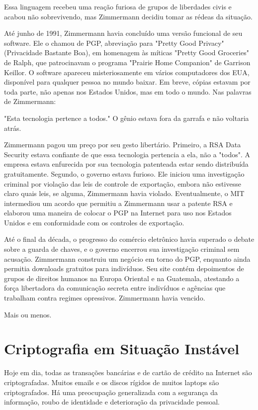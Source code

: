 \documentclass{book}
\begin{document}
Essa linguagem recebeu uma reação furiosa de grupos de liberdades civis e acabou não sobrevivendo, mas Zimmermann decidiu tomar as rédeas da situação.

Até junho de 1991, Zimmermann havia concluído uma versão funcional de seu software. Ele o chamou de PGP, abreviação para "Pretty Good Privacy" (Privacidade Bastante Boa), em homenagem às míticas "Pretty Good Groceries" de Ralph, que patrocinavam o programa "Prairie Home Companion" de Garrison Keillor. O software apareceu misteriosamente em vários computadores dos EUA, disponível para qualquer pessoa no mundo baixar. Em breve, cópias estavam por toda parte, não apenas nos Estados Unidos, mas em todo o mundo. Nas palavras de Zimmermann:

"Esta tecnologia pertence a todos." O gênio estava fora da garrafa e não voltaria atrás.

Zimmermann pagou um preço por seu gesto libertário. Primeiro, a RSA Data Security estava confiante de que essa tecnologia pertencia a ela, não a "todos". A empresa estava enfurecida por sua tecnologia patenteada estar sendo distribuída gratuitamente. Segundo, o governo estava furioso. Ele iniciou uma investigação criminal por violação das leis de controle de exportação, embora não estivesse claro quais leis, se alguma, Zimmermann havia violado. Eventualmente, o MIT intermediou um acordo que permitiu a Zimmermann usar a patente RSA e elaborou uma maneira de colocar o PGP na Internet para uso nos Estados Unidos e em conformidade com os controles de exportação.

Até o final da década, o progresso do comércio eletrônico havia superado o debate sobre a guarda de chaves, e o governo encerrou sua investigação criminal sem acusação. Zimmermann construiu um negócio em torno do PGP, enquanto ainda permitia downloads gratuitos para indivíduos. Seu site contém depoimentos de grupos de direitos humanos na Europa Oriental e na Guatemala, atestando a força libertadora da comunicação secreta entre indivíduos e agências que trabalham contra regimes opressivos. Zimmermann havia vencido.

Mais ou menos.

\section{Criptografia em Situação Instável}
\label{}

Hoje em dia, todas as transações bancárias e de cartão de crédito na Internet são criptografadas. Muitos emails e os discos rígidos de muitos laptops são criptografados. Há uma preocupação generalizada com a segurança da informação, roubo de identidade e deterioração da privacidade pessoal.
\end{document}
